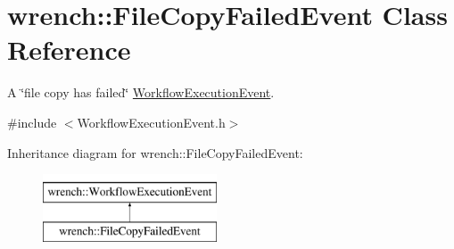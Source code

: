 \hypertarget{classwrench_1_1_file_copy_failed_event}{}\section{wrench\+:\+:File\+Copy\+Failed\+Event Class Reference}
\label{classwrench_1_1_file_copy_failed_event}


A \char`\"{}file copy has failed\char`\"{} \hyperlink{classwrench_1_1_workflow_execution_event}{Workflow\+Execution\+Event}.  




{\ttfamily \#include $<$Workflow\+Execution\+Event.\+h$>$}

Inheritance diagram for wrench\+:\+:File\+Copy\+Failed\+Event\+:\begin{figure}[H]
\begin{center}
\leavevmode
\includegraphics[height=2.000000cm]{classwrench_1_1_file_copy_failed_event}
\end{center}
\end{figure}
